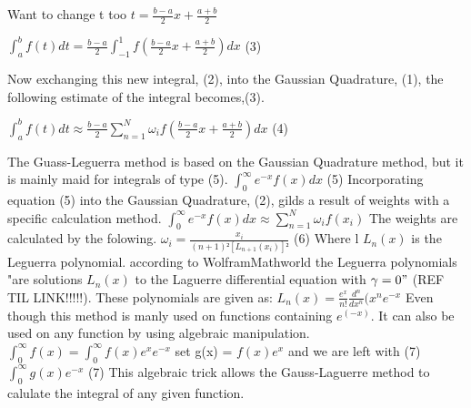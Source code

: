 \documentclass{article}
\begin{document}
Want to change t too $t = \frac{b-a}{2}x + \frac{a+b}{2}$
\newline
\newline

$\int_{a}^{b} f(t) dt = \frac{b-a}{2}\int_{-1}^{1} f(\frac{b-a}{2}x + \frac{a+b}{2}) dx$ (3)
\newline
\newline

Now exchanging this new integral, (2), into the Gaussian Quadrature, (1), the following estimate of the integral becomes,(3). 
\newline
\newline

$\int_{a}^{b} f(t) dt \approx \frac{b-a}{2} \sum_{n=1}^{N} \omega_i f(\frac{b-a}{2}x + \frac{a+b}{2}) dx$ (4)
\newline
\newline

The Guass-Leguerra method is based on the Gaussian Quadrature method, but it is mainly maid for integrals of type (5).    
\newline
\newline
 $\int_{0}^{\infty} e^{-x} f(x)dx$ (5)
\newline
\newline
Incorporating equation (5) into the Gaussian Quadrature, (2), gilds a result of weights with a specific calculation method.
\newline
\newline
$\int_{0}^{\infty} e^{-x} f(x) dx \approx \sum_{n=1}^{N} \omega_if(x_i) $
\newline
\newline
The weights are calculated by the folowing.
\newline
\newline
$\omega_i = \frac{x_i}{(n+1)² [L_{n+1}(x_i)]²}$ (6)
\newline
\newline
Where l $L_n(x)$ is the Leguerra polynomial. according to WolframMathworld the Leguerra polynomials "are solutions $L_n(x)$ to the Laguerre differential equation with $\gamma=0"$ (REF TIL LINK!!!!!). These polynomials are given as:
\newline
\newline
$L_n(x) = \frac{e^x}{n!}\frac{d^n}{dx^n}(x^n e^{-x}$
\newline
\newline
Even though this method is manly used on functions containing $e^(-x)$. It can also be used on any function by using algebraic manipulation.
\newline
\newline
$\int_{0}^{\infty} f(x) = \int_{0}^{\infty} f(x) e^{x}e^{-x}$ 
\newline
\newline
set g(x) = $f(x) e^x$ and we are left with (7)
\newline
\newline
$\int_{0}^{\infty} g(x) e^{-x}$  (7)
\newline
\newline
This algebraic trick allows the Gauss-Laguerre method to calulate the integral of any given function.   
\end{document}
